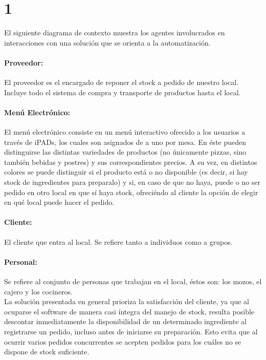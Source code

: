 \documentclass[a4paper,10pt]{article}
\begin{document}
\section*{1}
El siguiente diagrama de contexto muestra los agentes involucrados en interacciones con una solución que se orienta a la automatización. 

\paragraph{Proveedor:}
El proveedor es el encargado de reponer el stock a pedido de nuestro local. Incluye todo el sistema de compra y transporte de productos hasta el local.
\\
\paragraph{Menú Electrónico:}
El menú electrónico consiste en un menú interactivo ofrecido a los usuarios a través de iPADs, los cuales son asignados de a uno por mesa. En éste pueden distinguirse las distintas variedades de productos (no únicamente pizzas, sino también bebidas y postres) y sus correspondientes precios. A su vez, en distintos colores se puede distinguir si el producto está o no disponible (es decir, si hay stock de ingredientes para preparalo) y si, en caso de que no haya, puede o no ser pedido en otro local en que sí haya stock, ofreciéndo al cliente la opción de elegir en qué local puede hacer el pedido.
\\
\paragraph{Cliente:}
El cliente que entra al local. Se refiere tanto a individuos como a grupos.
\\
\paragraph{Personal:}
Se refiere al conjunto de personas que trabajan en el local, éstos son: los mozos, el cajero y los cocineros.
\\

La solución presentada en general prioriza la satisfacción del cliente, ya que al ocuparse el software de manera casi íntegra del manejo de stock, resulta posible descontar inmediatamente la disponibilidad de un determinado ingrediente al registrarse un pedido, incluso antes de iniciarse su preparación. Esto evita que al ocurrir varios pedidos concurrentes se acepten pedidos para los cuáles no se dispone de stock suficiente.
\end{document}
